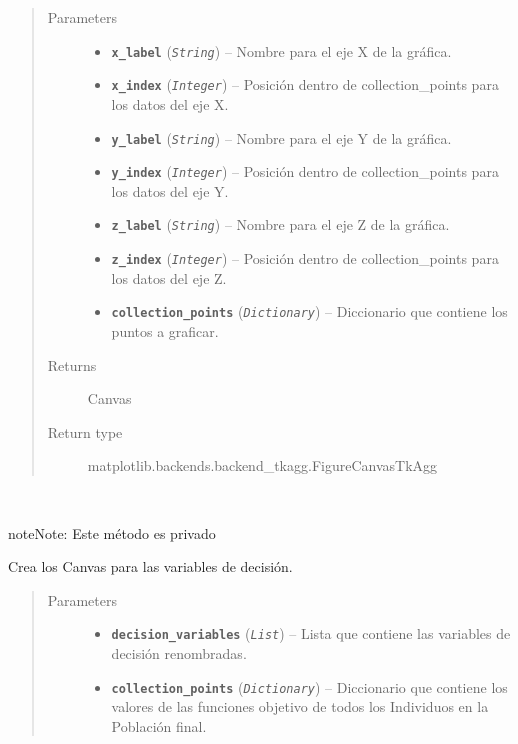 \documentclass[class=report, crop=false]{standalone}
\begin{document}
\begin{fulllineitems}
\begin{fulllineitems}
\begin{quote}\begin{description}
\item[{Parameters}] \leavevmode\begin{itemize}
\item \textbf{\texttt{x\_label}} (\emph{\texttt{String}}) -- Nombre para el eje X de la gráfica.
\item \textbf{\texttt{x\_index}} (\emph{\texttt{Integer}}) -- Posición dentro de collection\_points para los datos del eje X.
\item \textbf{\texttt{y\_label}} (\emph{\texttt{String}}) -- Nombre para el eje Y de la gráfica.
\item \textbf{\texttt{y\_index}} (\emph{\texttt{Integer}}) -- Posición dentro de collection\_points para los datos del eje Y.
\item \textbf{\texttt{z\_label}} (\emph{\texttt{String}}) -- Nombre para el eje Z de la gráfica.
\item \textbf{\texttt{z\_index}} (\emph{\texttt{Integer}}) -- Posición dentro de collection\_points para los datos del eje Z.
\item \textbf{\texttt{collection\_points}} (\emph{\texttt{Dictionary}}) -- Diccionario que contiene los puntos a graficar.
\end{itemize}

\item[{Returns}] \leavevmode
Canvas
\item[{Return type}] \leavevmode
matplotlib.backends.backend\_tkagg.FigureCanvasTkAgg
\end{description}\end{quote}

\end{fulllineitems}

\begin{fulllineitems}

~

\begin{notice}{note}{Note:}
Este método es privado
\end{notice}

Crea los Canvas para las variables de decisión.

\begin{quote}\begin{description}
\item[{Parameters}] \leavevmode\begin{itemize}
\item \textbf{\texttt{decision\_variables}} (\emph{\texttt{List}}) -- Lista que contiene las variables de decisión renombradas.
\item \textbf{\texttt{collection\_points}} (\emph{\texttt{Dictionary}}) -- Diccionario que contiene los valores de las funciones objetivo de todos los Individuos en la Población final.
\end{itemize}
\end{description}\end{quote}


\end{fulllineitems}
\end{fulllineitems}
\end{document}
